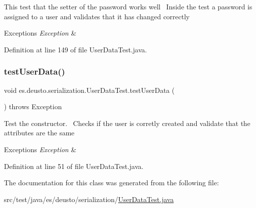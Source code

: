 This test that the setter of the password works well~\newline
Inside the test a password is assigned to a user and validates that it has changed correctly~\newline

\begin{DoxyExceptions}{Exceptions}
{\em Exception} & \\
\hline
\end{DoxyExceptions}


Definition at line 149 of file User\+Data\+Test.\+java.

\mbox{\label{classes_1_1deusto_1_1serialization_1_1_user_data_test_ac1b9100261a66d06a4c8bf4f80e859ba}} 
\subsubsection{\texorpdfstring{test\+User\+Data()}{testUserData()}}
{\footnotesize\ttfamily void es.\+deusto.\+serialization.\+User\+Data\+Test.\+test\+User\+Data (\begin{DoxyParamCaption}{ }\end{DoxyParamCaption}) throws Exception}

Test the constructor.~\newline
Checks if the user is corretly created and validate that the attributes are the same 
\begin{DoxyExceptions}{Exceptions}
{\em Exception} & \\
\hline
\end{DoxyExceptions}


Definition at line 51 of file User\+Data\+Test.\+java.



The documentation for this class was generated from the following file\+:\begin{DoxyCompactItemize}
\item 
src/test/java/es/deusto/serialization/\hyperlink{_user_data_test_8java}{User\+Data\+Test.\+java}\end{DoxyCompactItemize}
